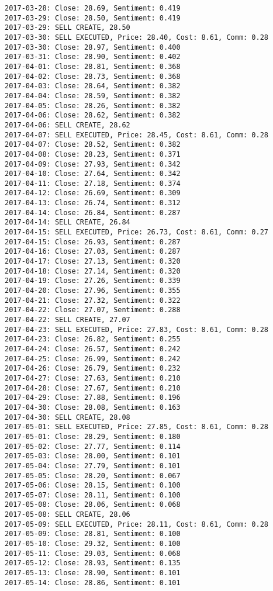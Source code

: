\documentclass[11pt]{article}
\begin{document}
\begin{Verbatim}[commandchars=\\\{\}]
2017-03-28: Close: 28.69, Sentiment: 0.419
2017-03-29: Close: 28.50, Sentiment: 0.419
2017-03-29: SELL CREATE, 28.50
2017-03-30: SELL EXECUTED, Price: 28.40, Cost: 8.61, Comm: 0.28
2017-03-30: Close: 28.97, Sentiment: 0.400
2017-03-31: Close: 28.90, Sentiment: 0.402
2017-04-01: Close: 28.81, Sentiment: 0.368
2017-04-02: Close: 28.73, Sentiment: 0.368
2017-04-03: Close: 28.64, Sentiment: 0.382
2017-04-04: Close: 28.59, Sentiment: 0.382
2017-04-05: Close: 28.26, Sentiment: 0.382
2017-04-06: Close: 28.62, Sentiment: 0.382
2017-04-06: SELL CREATE, 28.62
2017-04-07: SELL EXECUTED, Price: 28.45, Cost: 8.61, Comm: 0.28
2017-04-07: Close: 28.52, Sentiment: 0.382
2017-04-08: Close: 28.23, Sentiment: 0.371
2017-04-09: Close: 27.93, Sentiment: 0.342
2017-04-10: Close: 27.64, Sentiment: 0.342
2017-04-11: Close: 27.18, Sentiment: 0.374
2017-04-12: Close: 26.69, Sentiment: 0.309
2017-04-13: Close: 26.74, Sentiment: 0.312
2017-04-14: Close: 26.84, Sentiment: 0.287
2017-04-14: SELL CREATE, 26.84
2017-04-15: SELL EXECUTED, Price: 26.73, Cost: 8.61, Comm: 0.27
2017-04-15: Close: 26.93, Sentiment: 0.287
2017-04-16: Close: 27.03, Sentiment: 0.287
2017-04-17: Close: 27.13, Sentiment: 0.320
2017-04-18: Close: 27.14, Sentiment: 0.320
2017-04-19: Close: 27.26, Sentiment: 0.339
2017-04-20: Close: 27.96, Sentiment: 0.355
2017-04-21: Close: 27.32, Sentiment: 0.322
2017-04-22: Close: 27.07, Sentiment: 0.288
2017-04-22: SELL CREATE, 27.07
2017-04-23: SELL EXECUTED, Price: 27.83, Cost: 8.61, Comm: 0.28
2017-04-23: Close: 26.82, Sentiment: 0.255
2017-04-24: Close: 26.57, Sentiment: 0.242
2017-04-25: Close: 26.99, Sentiment: 0.242
2017-04-26: Close: 26.79, Sentiment: 0.232
2017-04-27: Close: 27.63, Sentiment: 0.210
2017-04-28: Close: 27.67, Sentiment: 0.210
2017-04-29: Close: 27.88, Sentiment: 0.196
2017-04-30: Close: 28.08, Sentiment: 0.163
2017-04-30: SELL CREATE, 28.08
2017-05-01: SELL EXECUTED, Price: 27.85, Cost: 8.61, Comm: 0.28
2017-05-01: Close: 28.29, Sentiment: 0.180
2017-05-02: Close: 27.77, Sentiment: 0.114
2017-05-03: Close: 28.00, Sentiment: 0.101
2017-05-04: Close: 27.79, Sentiment: 0.101
2017-05-05: Close: 28.20, Sentiment: 0.067
2017-05-06: Close: 28.15, Sentiment: 0.100
2017-05-07: Close: 28.11, Sentiment: 0.100
2017-05-08: Close: 28.06, Sentiment: 0.068
2017-05-08: SELL CREATE, 28.06
2017-05-09: SELL EXECUTED, Price: 28.11, Cost: 8.61, Comm: 0.28
2017-05-09: Close: 28.81, Sentiment: 0.100
2017-05-10: Close: 29.32, Sentiment: 0.100
2017-05-11: Close: 29.03, Sentiment: 0.068
2017-05-12: Close: 28.93, Sentiment: 0.135
2017-05-13: Close: 28.90, Sentiment: 0.101
2017-05-14: Close: 28.86, Sentiment: 0.101

\end{Verbatim}
\end{document}
